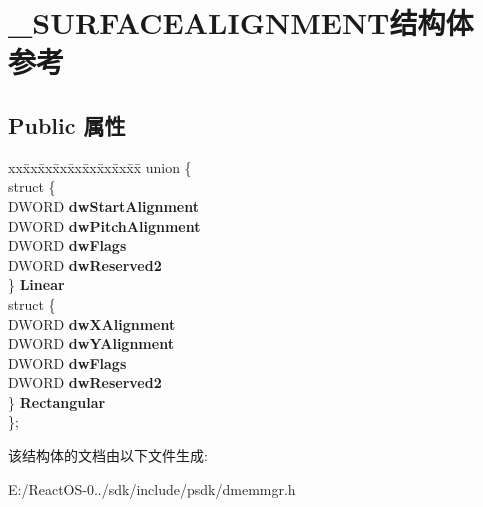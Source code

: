 \hypertarget{struct___s_u_r_f_a_c_e_a_l_i_g_n_m_e_n_t}{}\section{\+\_\+\+S\+U\+R\+F\+A\+C\+E\+A\+L\+I\+G\+N\+M\+E\+N\+T结构体 参考}
\label{struct___s_u_r_f_a_c_e_a_l_i_g_n_m_e_n_t}
\subsection*{Public 属性}
\begin{DoxyCompactItemize}
\item 
\mbox{\label{struct___s_u_r_f_a_c_e_a_l_i_g_n_m_e_n_t_a169c2895e04fe2a0a5e7adae8d349bfc}} 
\begin{tabbing}
xx\=xx\=xx\=xx\=xx\=xx\=xx\=xx\=xx\=\kill
union \{\\
\>struct \{\\
\>\>DWORD {\bfseries dwStartAlignment}\\
\>\>DWORD {\bfseries dwPitchAlignment}\\
\>\>DWORD {\bfseries dwFlags}\\
\>\>DWORD {\bfseries dwReserved2}\\
\>\} {\bfseries Linear}\\
\>struct \{\\
\>\>DWORD {\bfseries dwXAlignment}\\
\>\>DWORD {\bfseries dwYAlignment}\\
\>\>DWORD {\bfseries dwFlags}\\
\>\>DWORD {\bfseries dwReserved2}\\
\>\} {\bfseries Rectangular}\\
\}; \\

\end{tabbing}\end{DoxyCompactItemize}


该结构体的文档由以下文件生成\+:\begin{DoxyCompactItemize}
\item 
E\+:/\+React\+O\+S-\/0../sdk/include/psdk/dmemmgr.\+h\end{DoxyCompactItemize}
